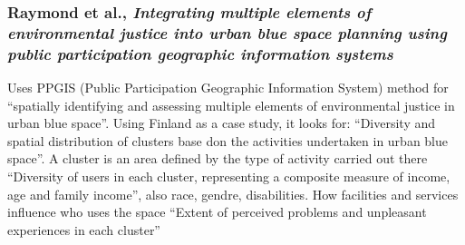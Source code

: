 \documentclass{article}
\begin{document}
\subsubsection{Raymond et al., \textit{Integrating multiple elements of environmental justice into urban blue space planning using public participation geographic information systems}} \parencite{raymond2016integrating}

\begin{outline}
	\1 Uses PPGIS (Public Participation Geographic Information System) method for ``spatially identifying and assessing multiple elements of environmental justice in urban blue space''. Using Finland as a case study, it looks for:
		\2 ``Diversity and spatial distribution of clusters base don the activities undertaken in urban blue space''. A cluster is an area defined by the type of activity carried out there
		\2 ``Diversity of users in each cluster, representing a composite measure of income, age and family income'', also race, gendre, disabilities. How facilities and services influence who uses the space
		\2 ``Extent of perceived problems and unpleasant experiences in each cluster'' 


\end{outline}
\end{document}
